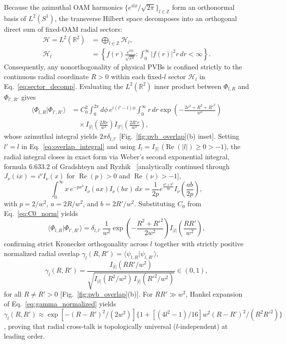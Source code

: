 \documentclass[aps,pra,onecolumn,notitlepage,11pt,tightenlines,nofootinbib,floatfix,longbibliography]{revtex4-2}
\theoremstyle{remark}
\newcommand{\braket}[2]{\langle #1 | #2 \rangle}
\newcommand{\abs}[1]{\lvert #1 \rvert}
\begin{document}
Because the azimuthal OAM harmonics $\{e^{il\phi}/\sqrt{2\pi}\}_{l\in\mathbb{Z}}$ form an orthonormal basis of $L^2(S^1)$, the transverse Hilbert space decomposes into an orthogonal direct sum of fixed-OAM radial sectors:
\begin{align}
\mathcal{H} = L^2(\mathbb{R}^2) &= \bigoplus_{l\in\mathbb{Z}} \mathcal{H}_l, \nonumber \\
\mathcal{H}_l &= \left\{ f(r)\frac{e^{il\phi}}{\sqrt{2\pi}} : \int_0^\infty \abs{f(r)}^2 r\,dr < \infty \right\}.
\label{eq:sector_decomp}
\end{align}
Consequently, any nonorthogonality of physical PVBs is confined strictly to the continuous radial coordinate $R > 0$ within each fixed-$l$ sector $\mathcal{H}_l$ in Eq.~\eqref{eq:sector_decomp}. Evaluating the $L^2(\mathbb{R}^2)$ inner product between $\Phi_{l,R}$ and $\Phi_{l',R'}$ gives
\begin{align}
\braket{\Phi_{l,R}}{\Phi_{l',R'}} &= C_0^2 \int_0^{2\pi} d\phi\, e^{i(l'-l)\phi} \int_0^\infty r\,dr \exp\!\left(-\frac{2r^2 + R^2 + R'^2}{w^2}\right) \nonumber \\
&\quad \times I_{\abs{l}}\!\left(\frac{2Rr}{w^2}\right) I_{\abs{l'}}\!\left(\frac{2R'r}{w^2}\right),
\label{eq:overlap_integral}
\end{align}
whose azimuthal integral yields $2\pi\delta_{l,l'}$ [Fig.~\ref{fig:pvb_overlap}(b) inset]. Setting $l' = l$ in Eq.~\eqref{eq:overlap_integral} and using $I_l = I_{\abs{l}}$ ($\operatorname{Re}(\abs{l}) \ge 0 > -1$), the radial integral closes in exact form via Weber's second exponential integral, formula 6.633.2 of Gradshteyn and Ryzhik~\cite{Gradshteyn2014} [analytically continued through $J_\nu(ix) = i^\nu I_\nu(x)$ for $\operatorname{Re}(p) > 0$ and $\operatorname{Re}(\nu) > -1$],
\begin{equation}
\int_0^\infty x\, e^{-p x^2} I_\nu(a x) I_\nu(b x)\,dx = \frac{1}{2p} e^{\frac{a^2 + b^2}{4p}} I_\nu\!\left(\frac{ab}{2p}\right),
\label{eq:weber_identity}
\end{equation}
with $p = 2/w^2$, $a = 2R/w^2$, and $b = 2R'/w^2$. Substituting $C_0$ from Eq.~\eqref{eq:C0_norm} yields
\begin{equation}
\braket{\Phi_{l,R}}{\Phi_{l',R'}} = \delta_{l,l'}\,\frac{1}{w^2}\exp\!\left(-\frac{R^2 + R'^2}{2w^2}\right) I_{\abs{l}}\!\left(\frac{RR'}{w^2}\right),
\label{eq:overlap_closed}
\end{equation}
confirming strict Kronecker orthogonality across $l$ together with strictly positive normalized radial overlap $\gamma_l(R,R') = \braket{\psi_{l,R}}{\psi_{l,R'}}$,
\begin{equation}
\gamma_l(R,R') = \frac{I_{\abs{l}}(RR'/w^2)}{\sqrt{I_{\abs{l}}(R^2/w^2)\,I_{\abs{l}}(R'^2/w^2)}} \in (0,1),
\label{eq:gamma_normalized}
\end{equation}
for all $R \neq R' > 0$ [Fig.~\ref{fig:pvb_overlap}(b)]. For $RR' \gg w^2$, Hankel expansion of Eq.~\eqref{eq:gamma_normalized} yields $\gamma_l(R,R') \approx \exp[-(R-R')^2/(2w^2)]\{1 + [(4l^2 - 1)/16]w^2(R-R')^2/(R^2 R'^2)\}$, proving that radial cross-talk is topologically universal ($l$-independent) at leading order.
\end{document}
